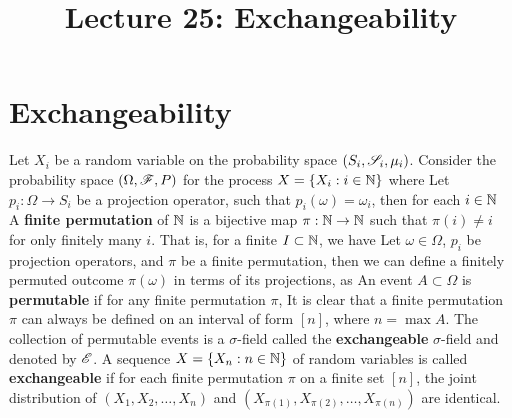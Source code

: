\documentclass[a4paper,english,10pt]{article}
\title{Lecture 25: Exchangeability}
\author{}
\begin{document}
\maketitle

\section{Exchangeability}
Let $X_i$ be a random variable on the probability space $(S_i, \mathscr{S}_i, \mu_i)$. 
Consider the probability space $(\Omega, \mathscr{F}, P)$ for the process $X = \{X_i: i \in \mathbb{N}\}$ where 
Let $p_i : \Omega \to S_i$ be a projection operator, such that $p_i(\omega) = \omega_i$, 
then for each $i \in \mathbb{N}$
A \textbf{finite permutation} of $\mathbb{N}$ is a bijective map $\pi: \mathbb{N} \to \mathbb{N}$ such that 
$\pi(i) \neq i$ for only finitely many $i$. 
That is, for a finite $I \subset \mathbb{N}$, we have 
Let $\omega \in \Omega$, $p_i$ be projection operators, and $\pi$ be a finite permutation, 
then we can define a finitely permuted outcome $\pi(\omega)$ in terms of its projections, as  
An event $A \subset \Omega$ is \textbf{permutable} if 
for any finite permutation $\pi$, 
It is clear that a finite permutation $\pi$ can always be defined on an interval of form $[n]$, 
where $n = \max A$. 
The collection of permutable events is a $\sigma$-field called the \textbf{exchangeable} $\sigma$-field and denoted by $\mathscr{E}$.
A sequence $X = \{X_n: n \in \mathbb{N}\}$ of random variables is called \textbf{exchangeable} if for each finite permutation $\pi$ on a finite set $[n]$, the joint distribution of $(X_1, X_2, \ldots, X_n)$ and $(X_{\pi(1)}, X_{\pi(2)}, \ldots, X_{\pi(n)})$ are identical. 
\end{document}
